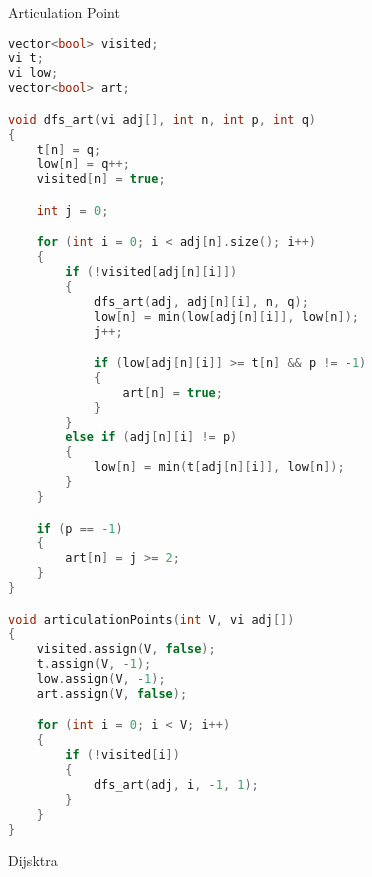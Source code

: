 \documentclass[leter]{amsart}
\begin{document}
Articulation Point
\begin{multicols}{2}
\begin{lstlisting}[language=C++]
vector<bool> visited;
vi t;
vi low;
vector<bool> art;

void dfs_art(vi adj[], int n, int p, int q)
{
    t[n] = q;
    low[n] = q++;
    visited[n] = true;

    int j = 0;

    for (int i = 0; i < adj[n].size(); i++)
    {
        if (!visited[adj[n][i]])
        {
            dfs_art(adj, adj[n][i], n, q);
            low[n] = min(low[adj[n][i]], low[n]);
            j++;

            if (low[adj[n][i]] >= t[n] && p != -1)
            {
                art[n] = true;
            }
        }
        else if (adj[n][i] != p)
        {
            low[n] = min(t[adj[n][i]], low[n]);
        }
    }

    if (p == -1)
    {
        art[n] = j >= 2;
    }
}

void articulationPoints(int V, vi adj[])
{
    visited.assign(V, false);
    t.assign(V, -1);
    low.assign(V, -1);
    art.assign(V, false);

    for (int i = 0; i < V; i++)
    {
        if (!visited[i])
        {
            dfs_art(adj, i, -1, 1);
        }
    }
}


\end{lstlisting}
\end{multicols}
Dijsktra
\end{document}
